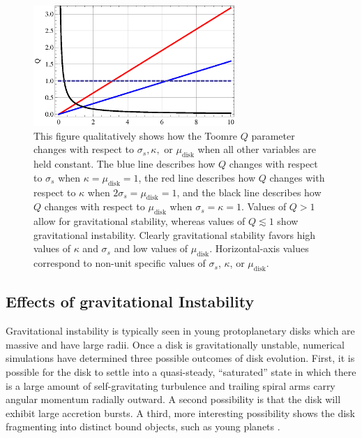 \documentclass[aps,pra, twocolumn]{revtex4-1}
\begin{document}
\begin{figure} [t!]
	\includegraphics[width=3in]{qplot.eps}
	\caption{This figure qualitatively shows how the Toomre $Q$ parameter changes with respect to $\sigma_s, \kappa,$ or $\mu_\text{disk}$ when all other variables are held constant.  The blue line describes how $Q$ changes with respect to $\sigma_s$ when $\kappa = \mu_\text{disk} = 1$, the red line describes how $Q$ changes with respect to $\kappa$ when $2\sigma_s = \mu_\text{disk} = 1$, and the black line describes how $Q$ changes with respect to $\mu_\text{disk}$ when $\sigma_s = \kappa = 1$.  Values of $Q > 1$ allow for gravitational stability, whereas values of $Q \lesssim 1$ show gravitational instability.  Clearly gravitational stability favors high values of $\kappa$ and $\sigma_s$ and low values of $\mu_\text{disk}$. Horizontal-axis values correspond to non-unit specific values of $\sigma_s$, $\kappa$, or $\mu_\text{disk}$. \label{qFig}}
\end{figure}



\subsection{\label{section 3.2} Effects of gravitational Instability}
Gravitational instability is typically seen in young protoplanetary disks which are massive and have large radii.  Once a disk is gravitationally unstable, numerical simulations have determined three possible outcomes of disk evolution.  First, it is possible for the disk to settle into a quasi-steady, ``saturated'' state in which there is a large amount of self-gravitating turbulence and trailing spiral arms carry angular momentum radially outward.  A second possibility is that the disk will exhibit large accretion bursts.  A third, more interesting possibility shows the disk fragmenting into distinct bound objects, such as young planets \cite{armitage2011}.
\end{document}
